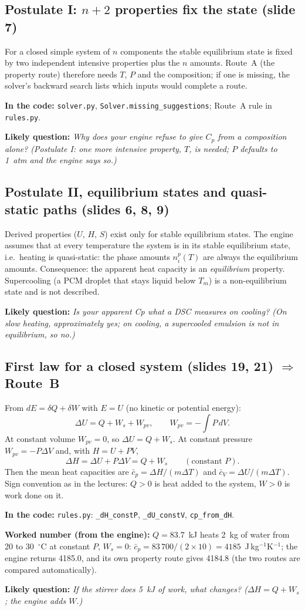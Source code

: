 \documentclass[11pt,a4paper]{article}
\newcommand{\code}[1]{\texttt{\small #1}}
\newcommand{\where}[1]{\par\noindent\textbf{In the code:} #1\par}
\newcommand{\num}[1]{\par\noindent\textbf{Worked number (from the engine):} #1\par}
\newcommand{\ask}[1]{\par\noindent\textbf{Likely question:} \emph{#1}\par}
\begin{document}
\subsection{Postulate I: $n+2$ properties fix the state (slide 7)}
For a closed simple system of $n$ components the stable equilibrium state is fixed by two independent
intensive properties plus the $n$ amounts. Route~A (the property route) therefore needs $T$, $P$ and the
composition; if one is missing, the solver's backward search lists which inputs would complete a route.
\where{\code{solver.py}, \code{Solver.missing\_suggestions}; Route~A rule in \code{rules.py}.}
\ask{Why does your engine refuse to give $C_p$ from a composition alone? (Postulate I: one more intensive
property, $T$, is needed; $P$ defaults to 1~atm and the engine says so.)}

\subsection{Postulate II, equilibrium states and quasi-static paths (slides 6, 8, 9)}
Derived properties ($U$, $H$, $S$) exist only for stable equilibrium states. The engine assumes that at
every temperature the system is in its stable equilibrium state, i.e.\ heating is quasi-static: the phase
amounts $n_i^p(T)$ are always the equilibrium amounts. Consequence: the apparent heat capacity is an
\emph{equilibrium} property. Supercooling (a PCM droplet that stays liquid below $T_m$) is a non-equilibrium
state and is not described.
\ask{Is your apparent Cp what a DSC measures on cooling? (On slow heating, approximately yes; on cooling, a
supercooled emulsion is not in equilibrium, so no.)}

\subsection{First law for a closed system (slides 19, 21) $\Rightarrow$ Route~B}
From $dE=\delta Q+\delta W$ with $E=U$ (no kinetic or potential energy):
\[
\Delta U = Q + W_s + W_{pv},\qquad W_{pv}=-\int P\,dV .
\]
At constant volume $W_{pv}=0$, so $\Delta U=Q+W_s$. At constant pressure $W_{pv}=-P\Delta V$ and, with
$H=U+PV$,
\[
\Delta H=\Delta U+P\Delta V = Q+W_s \qquad(\text{constant }P).
\]
Then the mean heat capacities are $\bar c_p=\Delta H/(m\Delta T)$ and $\bar c_V=\Delta U/(m\Delta T)$.
Sign convention as in the lectures: $Q>0$ is heat added to the system, $W>0$ is work done on it.
\where{\code{rules.py}: \code{\_dH\_constP}, \code{\_dU\_constV}, \code{cp\_from\_dH}.}
\num{$Q=83.7$~kJ heats 2~kg of water from 20 to 30~$^\circ$C at constant $P$, $W_s=0$:
$\bar c_p=83\,700/(2\times10)=4185$~J\,kg$^{-1}$K$^{-1}$; the engine returns 4185.0, and its own
property route gives 4184.8 (the two routes are compared automatically).}
\ask{If the stirrer does 5~kJ of work, what changes? ($\Delta H=Q+W_s$; the engine adds $W$.)}
\end{document}
